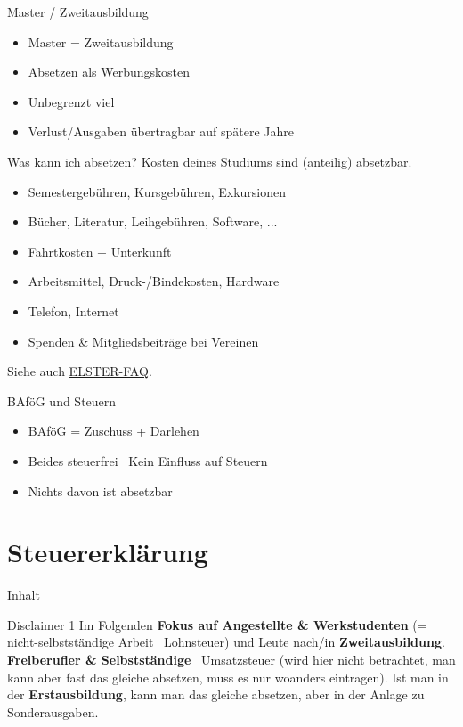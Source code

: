 \documentclass{beamer}
\begin{document}
		\begin{frame}{Master / Zweitausbildung}
			\begin{itemize}
				\item Master = Zweitausbildung
				\item Absetzen als Werbungskosten
				\item Unbegrenzt viel
				\item Verlust/Ausgaben übertragbar auf spätere Jahre
			\end{itemize}
		\end{frame}
	
		\begin{frame}{Was kann ich absetzen?}
			Kosten deines Studiums sind (anteilig) absetzbar.\n
			\begin{itemize}
				\item Semestergebühren, Kursgebühren, Exkursionen
				\item Bücher, Literatur, Leihgebühren, Software, ...
				\item Fahrtkosten + Unterkunft
				\item Arbeitsmittel, Druck-/Bindekosten, Hardware
				\item Telefon, Internet
				\item Spenden \& Mitgliedsbeiträge bei Vereinen
			\end{itemize}\n
			Siehe auch \href{https://www.elster.de/eportal/helpGlobal?themaGlobal=help_est_ufa_10_2023\#c9718}{ELSTER-FAQ}.
		\end{frame}
	
		\begin{frame}{BAföG und Steuern}
			\begin{itemize}
				\item BAföG = Zuschuss + Darlehen
				\item Beides steuerfrei \textrightarrow\ Kein Einfluss auf Steuern
				\item Nichts davon ist absetzbar
			\end{itemize}
		\end{frame}
	
	\section{Steuererklärung}
	
		\begin{frame}[t]{Inhalt}
		\end{frame}
	
		\begin{frame}{Disclaimer 1}
			Im Folgenden \textbf{Fokus auf Angestellte \& Werkstudenten} (= nicht-selbstständige Arbeit \textrightarrow\ Lohnsteuer) und Leute nach/in \textbf{Zweitausbildung}.\n\pause
			\textbf{Freiberufler \& Selbstständige} \textrightarrow\ Umsatzsteuer (wird hier nicht betrachtet, man kann aber fast das gleiche absetzen, muss es nur woanders eintragen).\noindent\pause
			Ist man in der \textbf{Erstausbildung}, kann man das gleiche absetzen, aber in der Anlage zu Sonderausgaben.
		\end{frame}
		
\end{document}

